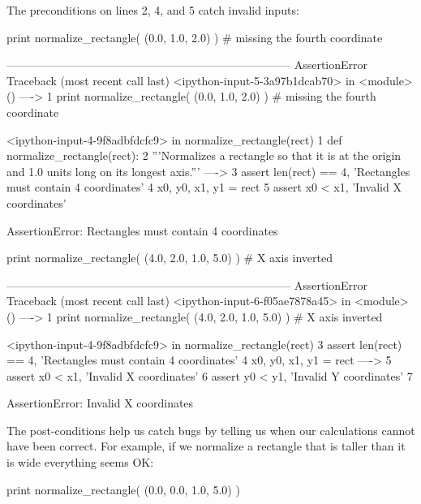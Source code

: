 \documentclass{book}
\begin{document}
The preconditions on lines 2, 4, and 5 catch invalid inputs:

\begin{VerbIn}
print normalize_rectangle( (0.0, 1.0, 2.0) ) # missing the fourth coordinate
\end{VerbIn}

\begin{VerbErr}
---------------------------------------------------------------------------
AssertionError                            Traceback (most recent call last)
<ipython-input-5-3a97b1dcab70> in <module>()
----> 1 print normalize_rectangle( (0.0, 1.0, 2.0) ) # missing the fourth coordinate

<ipython-input-4-9f8adbfdcfc9> in normalize_rectangle(rect)
      1 def normalize_rectangle(rect):
      2     '''Normalizes a rectangle so that it is at the origin and 1.0 units long on its longest axis.'''
----> 3     assert len(rect) == 4, 'Rectangles must contain 4 coordinates'
      4     x0, y0, x1, y1 = rect
      5     assert x0 < x1, 'Invalid X coordinates'

AssertionError: Rectangles must contain 4 coordinates
\end{VerbErr}

\begin{VerbIn}
print normalize_rectangle( (4.0, 2.0, 1.0, 5.0) ) # X axis inverted
\end{VerbIn}

\begin{VerbErr}
---------------------------------------------------------------------------
AssertionError                            Traceback (most recent call last)
<ipython-input-6-f05ae7878a45> in <module>()
----> 1 print normalize_rectangle( (4.0, 2.0, 1.0, 5.0) ) # X axis inverted

<ipython-input-4-9f8adbfdcfc9> in normalize_rectangle(rect)
      3     assert len(rect) == 4, 'Rectangles must contain 4 coordinates'
      4     x0, y0, x1, y1 = rect
----> 5     assert x0 < x1, 'Invalid X coordinates'
      6     assert y0 < y1, 'Invalid Y coordinates'
      7

AssertionError: Invalid X coordinates
\end{VerbErr}

The post-conditions help us catch bugs by telling us when our
calculations cannot have been correct. For example, if we normalize a
rectangle that is taller than it is wide everything seems OK:

\begin{VerbIn}
print normalize_rectangle( (0.0, 0.0, 1.0, 5.0) )
\end{VerbIn}
\end{document}
